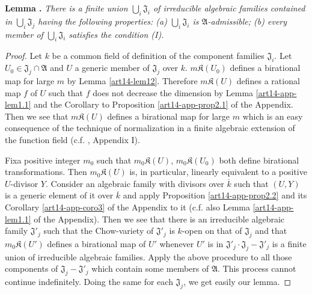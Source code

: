 \medskip
\noindent
{\bf Lemma .\label{art14-lem16}}
{\em There is a finite union $\bigcup_{i}\mathfrak{J}_{i}$ of irreducible algebraic families contained in $\bigcup_{i}\mathfrak{J}_{j}$ having the following properties: {\rm(a)} $\bigcup_{i}\mathfrak{J}_{i}$ is $\mathfrak{A}$-admissible; {\rm(b)} every member of $\bigcup_{i}\mathfrak{J}_{i}$ satisfies the condition {\rm(I)}.}

\begin{proof}
Let $k$ be a common field of definition of the component families $\mathfrak{J}_{i}$. Let $U_{0}\in \mathfrak{J}_{j}\cap \mathfrak{A}$ and $U$ a generic member of $\mathfrak{J}_{j}$ over $k$. $m\mathfrak{K}(U_{0})$ defines a birational map for large $m$ by Lemma \ref{art14-lem12}. Therefore $m\mathfrak{K}(U)$ defines a rational map $f$ of $U$ such that $f$ does not decrease the dimension by Lemma \ref{art14-app-lem1.1} and the Corollary to Proposition \ref{art14-app-prop2.1} of the Appendix. Then we see that $m\mathfrak{K}(U)$ defines a birational map for large $m$ which is an easy consequence of the technique of normalization in a finite algebraic extension of the function field (c.f. \cite{art14-key25}, Appendix I).

Fix\pageoriginale a positive integer $m_{0}$ such that $m_{0}\mathfrak{K}(U)$, $m_{0}\mathfrak{K}(U_{0})$ both define birational transformations. Then $m_{0}\mathfrak{K}(U)$ is, in particular, linearly equivalent to a positive $U$-divisor $Y$. Consider an algebraic family with divisors over $\overline{k}$ such that $(U,Y)$ is a generic element of it over $\overline{k}$ and apply Proposition \ref{art14-app-prop2.2} and its Corollary \ref{art14-app-coro3} of the Appendix to it (c.f. also Lemma \ref{art14-app-lem1.1} of the Appendix). Then we see that there is an irreducible algebraic family $\mathfrak{J}'_{j}$ such that the Chow-variety of $\mathfrak{J}'_{j}$ is $k$-open on that of $\mathfrak{J}_{j}$ and that $m_{0}\mathfrak{K}(U')$ defines a birational map of $U'$ whenever $U'$ is in $\mathfrak{J}'_{j}\cdot \mathfrak{J}_{j}-\mathfrak{J}'_{j}$ is a finite union of irreducible algebraic families. Apply the above procedure to all those components of $\mathfrak{J}_{j}-\mathfrak{J}'_{j}$ which contain some members of $\mathfrak{A}$. This process cannot continue indefinitely. Doing the same for each $\mathfrak{J}_{j}$, we get easily our lemma.
\end{proof}

